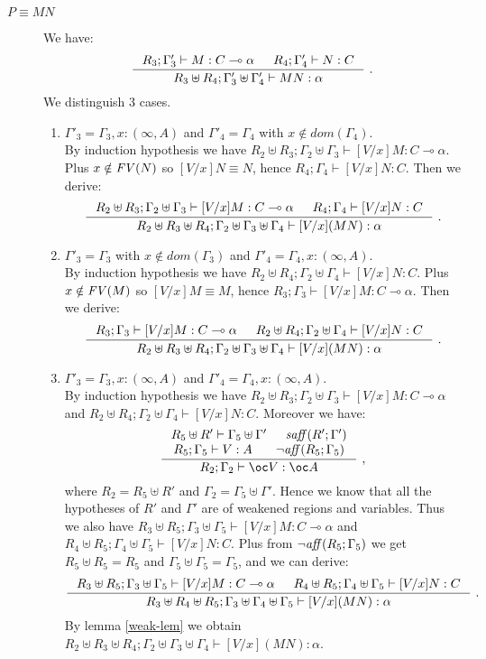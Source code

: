 \documentclass[11pt]{article}
\begin{document}
  \begin{description}

  \item[$P \equiv MN$] We have:
    $$
    \inference
    {R_3;\Gamma'_3\vdash M:C\multimap \alpha & R_4;\Gamma'_4\vdash N:C}
    {R_3\uplus R_4;\Gamma'_3\uplus\Gamma'_4\vdash MN:\alpha}~.
    $$
    We distinguish 3 cases.
    \begin{enumerate}

    \item 
$\Gamma'_3=\Gamma_3,x:(\infty,A)$ and 
$\Gamma'_4=\Gamma_4$ with $x \notin dom(\Gamma_4)$.\\
     By induction hypothesis we have $R_2\uplus
     R_3;\Gamma_2\uplus\Gamma_3\vdash [V/x]M:C\multimap \alpha$. Plus
     $x \notin {\it FV}(N)$ so $[V/x]N\equiv N$, hence
     $R_4;\Gamma_4\vdash [V/x]N:C$. Then we derive:
      $$
      \inference
      {R_2\uplus R_3;\Gamma_2\uplus\Gamma_3\vdash [V/x]M:
       C\multimap \alpha & R_4;\Gamma_4\vdash [V/x]N:C}
      {R_2\uplus R_3\uplus R_4;\Gamma_2\uplus\Gamma_3\uplus\Gamma_4
       \vdash [V/x](MN):\alpha}~.
      $$

    \item 
$\Gamma'_3=\Gamma_3$ with $x \notin dom(\Gamma_3)$ and 
$\Gamma'_4=\Gamma_4,x:(\infty,A)$.\\
      By induction hypothesis we have $R_2\uplus
      R_4;\Gamma_2\uplus\Gamma_4\vdash [V/x]N:C$. Plus $x \notin
      {\it FV}(M)$ so $[V/x]M\equiv M$, hence $R_3;\Gamma_3\vdash
      [V/x]M:C\multimap \alpha$. Then we derive:
      $$
      \inference
      {R_3;\Gamma_3\vdash [V/x]M:C\multimap \alpha & R_2\uplus R_4;\Gamma_2\uplus\Gamma_4\vdash [V/x]N:C}
      {R_2\uplus R_3\uplus R_4;\Gamma_2\uplus\Gamma_3\uplus\Gamma_4\vdash [V/x](MN):\alpha}~.
      $$
    \item 
$\Gamma'_3 = \Gamma_3,x:(\infty,A)$ and 
$\Gamma'_4 = \Gamma_4,x:(\infty,A)$.\\ 
By induction hypothesis we have
      $R_2\uplus R_3;\Gamma_2\uplus\Gamma_3\vdash [V/x]M:C\multimap
      \alpha$ and $R_2\uplus R_4;\Gamma_2\uplus\Gamma_4 \vdash
      [V/x]N:C$. Moreover we have:
      $$
      \inference
      {R_5\uplus R'\vdash \Gamma_5\uplus\Gamma' & \w{saff}(R';\Gamma')\\
        R_5;\Gamma_5\vdash V:A & \neg \w{aff}(R_5;\Gamma_5)}
      {R_2;\Gamma_2\vdash\oc V:\oc A}~,
      $$
      where $R_2=R_5\uplus R'$ and $\Gamma_2=\Gamma_5\uplus\Gamma'$.
Hence we know that all the hypotheses of $R'$ and $\Gamma'$ are of
weakened regions and variables. Thus we also have $R_3\uplus
R_5;\Gamma_3\uplus\Gamma_5\vdash [V/x]M:C\multimap \alpha$ and
$R_4\uplus R_5;\Gamma_4\uplus\Gamma_5\vdash [V/x]N:C$. Plus from $\neg
{\it aff}(R_5;\Gamma_5)$ we get $R_5\uplus R_5=R_5$ and
$\Gamma_5\uplus\Gamma_5=\Gamma_5$, and we can derive:
      $$
      \inference
      {R_3\uplus R_5;\Gamma_3\uplus\Gamma_5\vdash [V/x]M:C\multimap \alpha & R_4\uplus R_5;\Gamma_4\uplus\Gamma_5\vdash [V/x]N:C}
      {R_3\uplus R_4\uplus R_5;\Gamma_3\uplus\Gamma_4\uplus\Gamma_5\vdash [V/x](MN):\alpha}~.
      $$
      By lemma \ref{weak-lem} we obtain $R_2\uplus R_3\uplus R_4;\Gamma_2\uplus\Gamma_3\uplus\Gamma_4\vdash [V/x](MN):\alpha$.
    \end{enumerate}



\end{description}
\end{document}
